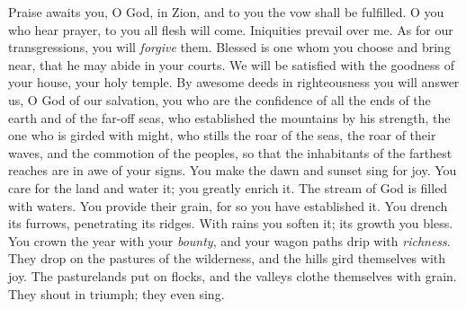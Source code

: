 \begin{biblechapter} %
 Praise awaits you, O God, in Zion, 
and to you the vow shall be fulfilled.
\verse O you who hear prayer, 
to you all flesh will come.
\verse Iniquities prevail over me. 
As for our transgressions, you will \textit{forgive} them.
\verse Blessed is one whom you choose and bring near, 
that he may abide in your courts. 
We will be satisfied with the goodness of your house, 
your holy temple.
\verse By awesome deeds in righteousness you will answer us, 
O God of our salvation, 
you who are the confidence of all the ends of the earth 
and of the far-off seas,
\verse who established the mountains by his strength, 
the one who is girded with might,
\verse who stills the roar of the seas, 
the roar of their waves, 
and the commotion of the peoples,
\verse so that the inhabitants of the farthest reaches are in awe of your signs. 
You make the dawn and sunset sing for joy.
\verse You care for the land and water it; 
you greatly enrich it. 
The stream of God is filled with waters. 
You provide their grain, 
for so you have established it.
\verse You drench its furrows, 
penetrating its ridges. 
With rains you soften it; 
its growth you bless.
\verse You crown the year with your \textit{bounty}, 
and your wagon paths drip with \textit{richness}.
\verse They drop on the pastures of the wilderness, 
and the hills gird themselves with joy.
\verse The pasturelands put on flocks, 
and the valleys clothe themselves with grain. 
They shout in triumph; 
they even sing.
\end{biblechapter}

